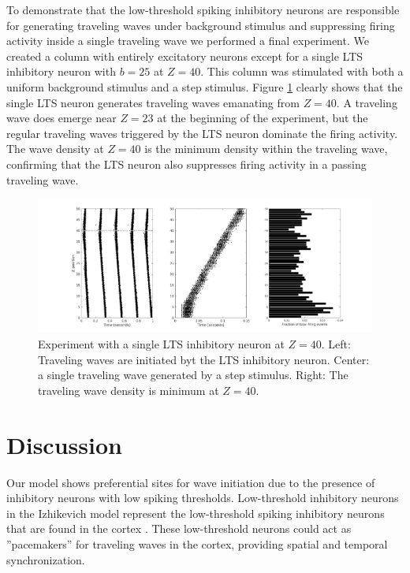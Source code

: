 \documentclass[a4paper,11pt]{article}
\begin{document}
To demonstrate that the low-threshold spiking inhibitory neurons are responsible for generating traveling waves under background stimulus and suppressing firing activity inside a single traveling wave we performed a final experiment.
We created a column with entirely excitatory neurons except for a single LTS inhibitory neuron with $b=25$ at $Z=40$.
This column was stimulated with both a uniform background stimulus and a step stimulus. 
Figure \ref{fig:lts_inhibit} clearly shows that the single LTS neuron generates traveling waves emanating from $Z=40$. 
A traveling wave does emerge near $Z=23$ at the beginning of the experiment, but the regular traveling waves triggered by the LTS neuron dominate the firing activity.
The wave density at $Z=40$ is the minimum density within the traveling wave, confirming that the LTS neuron also suppresses firing activity in a passing traveling wave.
\begin{figure}[!htb]
 \caption{Experiment with a single LTS inhibitory neuron at $Z=40$. Left: Traveling waves are initiated byt the LTS inhibitory neuron. Center: a single traveling wave generated by a step stimulus. Right: The traveling wave density is minimum at $Z=40$.}
 \label{fig:lts_inhibit}
 \centering
   \includegraphics[width=\textwidth]{fig/SingleLTSInhibit}
\end{figure}


\section{Discussion}
Our model shows preferential sites for wave initiation due to the presence of inhibitory neurons with low spiking thresholds.
Low-threshold inhibitory neurons in the Izhikevich model represent the low-threshold spiking inhibitory neurons that are found in the cortex \cite{izhikevich2003}\cite{gibson2009}.
These low-threshold neurons could act as ''pacemakers'' for traveling waves in the cortex, providing spatial and temporal synchronization.

\clearpage
\printbibliography
\end{document}
